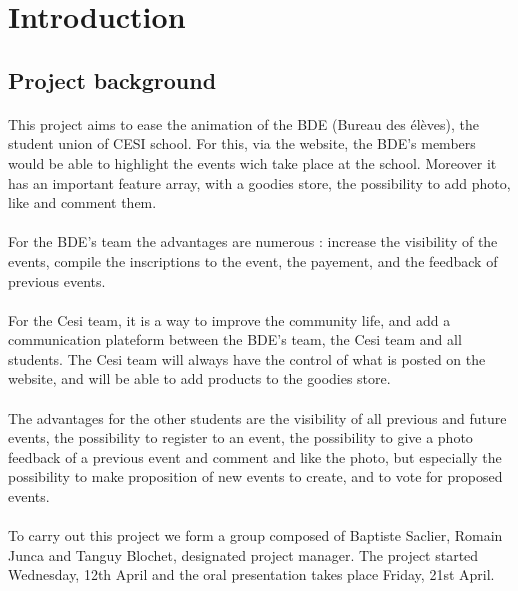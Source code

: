 \section{Introduction}
	\subsection{Project background}
		\paragraph{}
			This project aims to ease the animation of the BDE (Bureau des élèves), the student union of CESI school. For this, via the website, the BDE's members would be able to highlight the events wich take place at the school. Moreover it has an important feature array, with a goodies store, the possibility to add photo, like and comment them.

		\paragraph{}
			For the BDE's team the advantages are numerous : increase the visibility of the events, compile the inscriptions to the event, the payement, and the feedback of previous events.

		\paragraph{}
			For the Cesi team, it is a way to improve the community life, and add a communication plateform between the BDE's team, the Cesi team and all students. The Cesi team will always have the control of what is posted on the website, and will be able to add products to the goodies store.

		\paragraph{}
			The advantages for the other students are the visibility of all previous and future events, the possibility to register to an event, the possibility to give a photo feedback of a previous event and comment and like the photo, but especially the possibility to make proposition of new events to create, and to vote for proposed events.

		\paragraph{}
			To carry out this project we form a group composed of Baptiste Saclier, Romain Junca and Tanguy Blochet, designated project manager. The project started Wednesday, 12th April and the oral presentation takes place Friday, 21st April.


